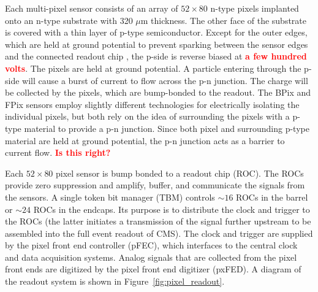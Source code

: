 \documentclass[dissertation.tex]{subfiles}
\begin{document}
Each multi-pixel sensor consists of an array of $52\times80$ n-type pixels implanted onto an n-type substrate with 320 $\mu\mbox{m}$ thickness.  The other face of the substrate is covered with a thin layer of p-type semiconductor.  Except for the outer edges, which are held at ground potential to prevent sparking between the sensor edges and the connected readout chip \cite{pixel_design_paper}, the p-side is reverse biased at \textcolor{red}{\textbf{a few hundred volts}}.  The pixels are held at ground potential.  A particle entering through the p-side will cause a burst of current to flow across the p-n junction.  The charge will be collected by the pixels, which are bump-bonded to the readout.  The BPix and FPix sensors employ slightly different technologies for electrically isolating the individual pixels, but both rely on the idea of surrounding the pixels with a p-type material to provide a p-n junction.  Since both pixel and surrounding p-type material are held at ground potential, the p-n junction acts as a barrier to current flow.  \textcolor{red}{\textbf{Is this right?}}

Each $52\times80$ pixel sensor is bump bonded to a readout chip (ROC).  The ROCs provide zero suppression and amplify,  buffer, and communicate the signals from the sensors.  A single token bit manager (TBM) controls $\sim16$ ROCs in the barrel or $\sim24$ ROCs in the endcaps.  Its purpose is to distribute the clock and trigger to the ROCs (the latter initiates a transmission of the signal further upstream to be assembled into the full event readout of CMS).  The clock and trigger are supplied by the pixel front end controller (pFEC), which interfaces to the central clock and data acquisition systems.  Analog signals that are collected from the pixel front ends are digitized by the pixel front end digitizer (pxFED).  A diagram of the readout system is shown in Figure~\ref{fig:pixel_readout}.
\end{document}
